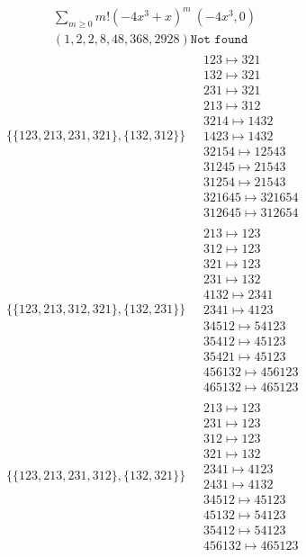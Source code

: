 \begin{scriptsize}
\begin{align}
\begin{matrix}
\end{matrix}
\end{align}
$$
\begin{matrix}
\sum_{m \geq 0} m! \left(
-4 x^{3} + x
\right)^m
\ 
\left(-4 x^{3}, 0\right)
\\
\left(1, 2, 2, 8, 48, 368, 2928\right)
\texttt{Not found}
\end{matrix}
$$
\begin{align}
\{\{123, 213, 231, 321\}, \{132, 312\}\}
\ 
&
\begin{matrix}
123 \mapsto 321\\132 \mapsto 321\\231 \mapsto 321\\213 \mapsto 312\\3214 \mapsto 1432\\1423 \mapsto 1432\\32154 \mapsto 12543\\31245 \mapsto 21543\\31254 \mapsto 21543\\321645 \mapsto 321654\\312645 \mapsto 312654
\end{matrix}
\\
\{\{123, 213, 312, 321\}, \{132, 231\}\}
\ 
&
\begin{matrix}
213 \mapsto 123\\312 \mapsto 123\\321 \mapsto 123\\231 \mapsto 132\\4132 \mapsto 2341\\2341 \mapsto 4123\\34512 \mapsto 54123\\35412 \mapsto 45123\\35421 \mapsto 45123\\456132 \mapsto 456123\\465132 \mapsto 465123
\end{matrix}
\\
\{\{123, 213, 231, 312\}, \{132, 321\}\}
\ 
&
\begin{matrix}
213 \mapsto 123\\231 \mapsto 123\\312 \mapsto 123\\321 \mapsto 132\\2341 \mapsto 4123\\2431 \mapsto 4132\\34512 \mapsto 45123\\45132 \mapsto 54123\\35412 \mapsto 54123\\456132 \mapsto 465123

\end{matrix}
\end{align}
\end{scriptsize}
